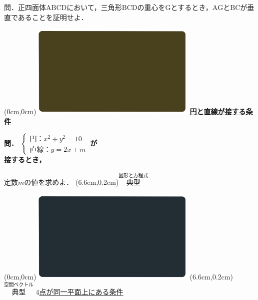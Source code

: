 \documentclass[10pt,
fleqn,
dvipdfmx,
uplatex
]{jsarticle}
\begin{document}
\LARGE 
問．正四面体$\text{ABCD}$において，三角形$\text{BCD}$の重心を$\text{G}$とするとき，$\text{AG}$と$\text{BC}$が垂直であることを証明せよ．


\newpage

\at(0cm,0cm){\includegraphics[width=8cm,bb=0 0 1920 1080]{./youtube/thumbnails/templates/smart_background/図形と方程式.jpeg}}
{\color{orange}\bf\boldmath\LARGE\underline{円と直線が接する条件}}\vspace{0.3zw}

\large
\bf\boldmath 問．
$\left\{\begin{array}{l} 円：x^2+y^2={10}\ \\直線：y=2x+m\ \end{array}\right.$が\\

\Huge
\vspace{-0.2zw}
\hspace{0.5zw}
接するとき，

\large
\vspace{0.4zw}
\hfill 定数$m$の値を求めよ．
\at(6.6cm,0.2cm){\small\color{bradorange}$\overset{\text{図形と方程式}}{\text{典型}}$}

\newpage



\at(0cm,0cm){\includegraphics[width=8cm,bb=0 0 1920 1080]{./youtube/thumbnails/templates/smart_background/空間ベクトル.jpeg}}
\at(6.6cm,0.2cm){\small\color{bradorange}$\overset{\text{空間ベクトル}}{\text{典型}}$}
{\color{orange}\Large\underline{$4$点が同一平面上にある条件}}\vspace{0.3zw}
\end{document}
